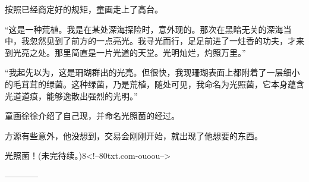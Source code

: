 \begin{this_body}
按照已经商定好的规矩，童画走上了高台。

“这是一种荒植。我是在某处深海探险时，意外现的。那次在黑暗无关的深海当中，我忽然见到了前方的一点亮光。我寻光而行，足足前进了一炷香的功夫，才来到光亮之处。那里简直是一片光道的天堂。光明灿烂，灼照万里。”

“我起先以为，这是珊瑚群出的光亮。但很快，我现珊瑚表面上都附着了一层细小的毛茸茸的绿菌。这种绿菌，乃是荒植，随处可见，我命名为光照菌，它本身蕴含光道道痕，能够逸散出强烈的光明。”

童画徐徐介绍了自己现，并命名光照菌的经过。

方源有些意外，他没想到，交易会刚刚开始，就出现了他想要的东西。

光照菌！(未完待续。)8<!--80txt.com-ouoou-->

------------

\end{this_body}

